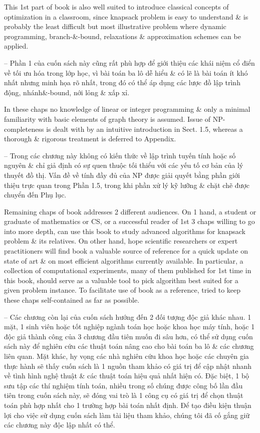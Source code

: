 \documentclass{article}
\begin{document}
\begin{itemize}
    This 1st part of book is also well suited to introduce classical concepts of optimization in a classroom, since knapsack problem is easy to understand \& is probably the least difficult but most illustrative problem where dynamic programming, branch-\&-bound, relaxations \& approximation schemes can be applied.

    -- Phần 1 của cuốn sách này cũng rất phù hợp để giới thiệu các khái niệm cổ điển về tối ưu hóa trong lớp học, vì bài toán ba lô dễ hiểu \& có lẽ là bài toán ít khó nhất nhưng minh họa rõ nhất, trong đó có thể áp dụng các lược đồ lập trình động, nhánh\&-bound, nới lỏng \& xấp xỉ.

    In these chaps no knowledge of linear or integer programming \& only a minimal familiarity with basic elements of graph theory is assumed. Issue of NP-completeness is dealt with by an intuitive introduction in Sect. 1.5, whereas a thorough \& rigorous treatment is deferred to Appendix.

    -- Trong các chương này không có kiến thức về lập trình tuyến tính hoặc số nguyên \& chỉ giả định có sự quen thuộc tối thiểu với các yếu tố cơ bản của lý thuyết đồ thị. Vấn đề về tính đầy đủ của NP được giải quyết bằng phần giới thiệu trực quan trong Phần 1.5, trong khi phần xử lý kỹ lưỡng \& chặt chẽ được chuyển đến Phụ lục.

    Remaining chaps of book addresses 2 different audiences. On 1 hand, a student or graduate of mathematics or CS, or a successful reader of 1st 3 chaps willing to go into more depth, can use this book to study advanced algorithms for knapsack problem \& its relatives. On other hand, hope scientific researchers or expert practitioners will find book a valuable source of reference for a quick update on state of art \& on most efficient algorithms currently available. In particular, a collection of computational experiments, many of them published for 1st time in this book, should serve as a valuable tool to pick algorithm best suited for a given problem instance. To facilitate use of book as a reference, tried to keep these chaps self-contained as far as possible.

    -- Các chương còn lại của cuốn sách hướng đến 2 đối tượng độc giả khác nhau. 1 mặt, 1 sinh viên hoặc tốt nghiệp ngành toán học hoặc khoa học máy tính, hoặc 1 độc giả thành công của 3 chương đầu tiên muốn đi sâu hơn, có thể sử dụng cuốn sách này để nghiên cứu các thuật toán nâng cao cho bài toán ba lô \& các chương liên quan. Mặt khác, hy vọng các nhà nghiên cứu khoa học hoặc các chuyên gia thực hành sẽ thấy cuốn sách là 1 nguồn tham khảo có giá trị để cập nhật nhanh về tình hình nghệ thuật \& các thuật toán hiệu quả nhất hiện có. Đặc biệt, 1 bộ sưu tập các thí nghiệm tính toán, nhiều trong số chúng được công bố lần đầu tiên trong cuốn sách này, sẽ đóng vai trò là 1 công cụ có giá trị để chọn thuật toán phù hợp nhất cho 1 trường hợp bài toán nhất định. Để tạo điều kiện thuận lợi cho việc sử dụng cuốn sách làm tài liệu tham khảo, chúng tôi đã cố gắng giữ các chương này độc lập nhất có thể.


\end{itemize}
\end{document}
